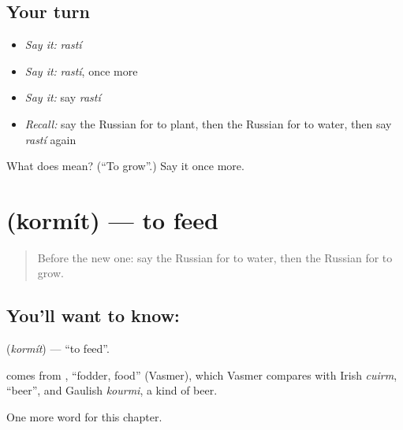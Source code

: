 \subsection*{Your turn}
\begin{itemize}
\raggedright
  \item \emph{Say it:} \emph{rastí}
  \item \emph{Say it:} \emph{rastí}, once more
  \item \emph{Say it:} say \emph{rastí}
  \item \emph{Recall:} say the Russian for to plant, then the Russian for to water, then say \emph{rastí} again
\end{itemize}

\begin{tcolorbox}[breakable,colback=teal!4,colframe=teal!35!black,title={Before you move on}]
What does  mean? (\textquotedblleft{}To grow\textquotedblright{}.) Say it once more.
\end{tcolorbox}
\section[\texorpdfstring{\ru{кормить} (kormít)}{кормить (kormít)}]{ (kormít) — to feed}

\label{lesson:RU-C234-kormit}



\begin{quote}
Before the new one: say the Russian for to water, then the Russian for to grow.
\end{quote}

\subsection*{You'll want to know: }
\textbf{} (\emph{kormít}) — \textquotedblleft{}to feed\textquotedblright{}.

\begin{cousinweb}
\textbf{} comes from \emph{}, \textquotedblleft{}fodder, food\textquotedblright{} (Vasmer), which Vasmer compares with Irish \emph{cuirm}, \textquotedblleft{}beer\textquotedblright{}, and Gaulish \emph{kourmi}, a kind of beer.
\end{cousinweb}

\begin{grammarlens}[title={What you've built}]
One more word for this chapter.
\end{grammarlens}

